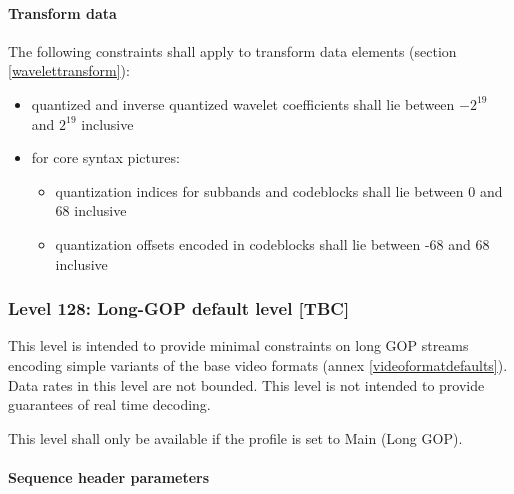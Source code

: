 \paragraph{Transform data\newline}

The following constraints shall apply to transform data elements 
(section \ref{wavelettransform}):
\begin{itemize}
\item quantized and inverse quantized wavelet coefficients shall lie 
between $-2^{19}$ and $2^{19}$ inclusive
\item for core syntax pictures:
    \begin{itemize}
    \item quantization indices for subbands and codeblocks shall lie between 
    0 and 68 inclusive 
    \item quantization offsets encoded in codeblocks shall lie between 
    -68 and 68 inclusive
    \end{itemize} 
\end{itemize} 

\subsubsection{Level 128: Long-GOP default level [TBC]}

This level is intended to provide minimal constraints on long GOP
streams encoding simple variants of the base video formats 
(annex \ref{videoformatdefaults}). 
Data rates in this level are not bounded. This level is not intended to provide
guarantees of real time decoding.

This level shall only be available if the profile is set to Main (Long GOP).

\paragraph{Sequence header parameters\newline}

